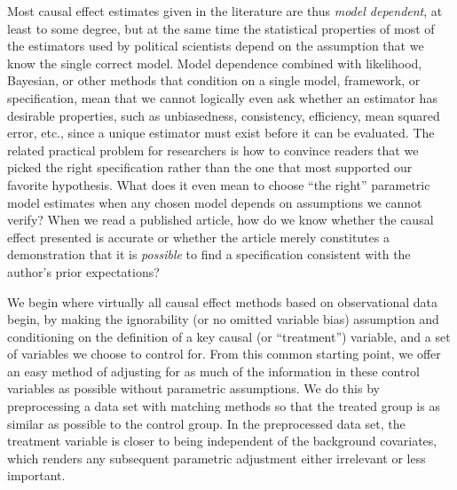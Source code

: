 \documentclass[11pt,titlepage]{article}
\begin{document}
Most causal effect estimates given in the literature are thus
\emph{model dependent}, at least to some degree, but at the same time
the statistical properties of most of the estimators used by political
scientists depend on the assumption that we know the single correct
model.  Model dependence combined with likelihood, Bayesian, or other
methods that condition on a single model, framework, or specification,
mean that we cannot logically even ask whether an estimator has
desirable properties, such as unbiasedness, consistency, efficiency,
mean squared error, etc., since a unique estimator must exist before it
can be evaluated.  The related practical problem for researchers is
how to convince readers that we picked the right specification rather
than the one that most supported our favorite hypothesis.  What does
it even mean to choose ``the right'' parametric model estimates when
any chosen model depends on assumptions we cannot verify?  When we
read a published article, how do we know whether the causal effect
presented is accurate or whether the article merely constitutes a
demonstration that it is \emph{possible} to find a specification
consistent with the author's prior expectations?

We begin where virtually all causal effect methods based on
observational data begin, by making the ignorability (or no omitted
variable bias) assumption and conditioning on the definition of a key
causal (or ``treatment'') variable, and a set of variables we choose
to control for.  From this common starting point, we offer an easy
method of adjusting for as much of the information in these control
variables as possible without parametric assumptions.  We do this by
preprocessing a data set with matching methods so that the treated
group is as similar as possible to the control group.  In the
preprocessed data set, the treatment variable is closer to being
independent of the background covariates, which renders any subsequent
parametric adjustment either irrelevant or less important.
\end{document}
